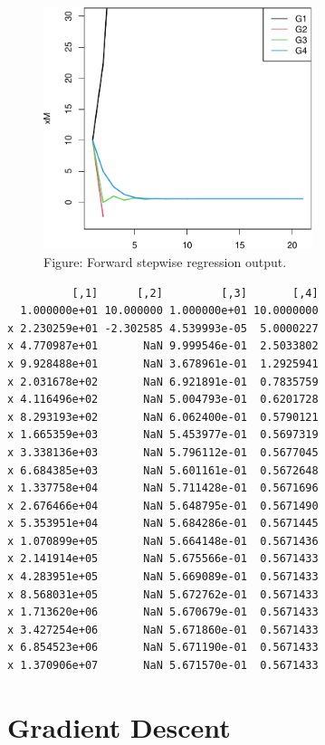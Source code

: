 \documentclass[
  letterpaper,
  DIV=11,
  numbers=noendperiod]{scrreprt}
\theoremstyle{definition}
\theoremstyle{definition}
\theoremstyle{remark}
\begin{document}
\begin{figure}[H]

{\centering \includegraphics[width=0.7\textwidth,height=\textheight]{optim_files/figure-pdf/unnamed-chunk-1-1.pdf}

}

\caption{Figure: Forward stepwise regression output.}

\end{figure}%

\begin{verbatim}
          [,1]      [,2]         [,3]       [,4]
  1.000000e+01 10.000000 1.000000e+01 10.0000000
x 2.230259e+01 -2.302585 4.539993e-05  5.0000227
x 4.770987e+01       NaN 9.999546e-01  2.5033802
x 9.928488e+01       NaN 3.678961e-01  1.2925941
x 2.031678e+02       NaN 6.921891e-01  0.7835759
x 4.116496e+02       NaN 5.004793e-01  0.6201728
x 8.293193e+02       NaN 6.062400e-01  0.5790121
x 1.665359e+03       NaN 5.453977e-01  0.5697319
x 3.338136e+03       NaN 5.796112e-01  0.5677045
x 6.684385e+03       NaN 5.601161e-01  0.5672648
x 1.337758e+04       NaN 5.711428e-01  0.5671696
x 2.676466e+04       NaN 5.648795e-01  0.5671490
x 5.353951e+04       NaN 5.684286e-01  0.5671445
x 1.070899e+05       NaN 5.664148e-01  0.5671436
x 2.141914e+05       NaN 5.675566e-01  0.5671433
x 4.283951e+05       NaN 5.669089e-01  0.5671433
x 8.568031e+05       NaN 5.672762e-01  0.5671433
x 1.713620e+06       NaN 5.670679e-01  0.5671433
x 3.427254e+06       NaN 5.671860e-01  0.5671433
x 6.854523e+06       NaN 5.671190e-01  0.5671433
x 1.370906e+07       NaN 5.671570e-01  0.5671433
\end{verbatim}

\chapter{Gradient Descent}\label{gradient-descent}
\end{document}
